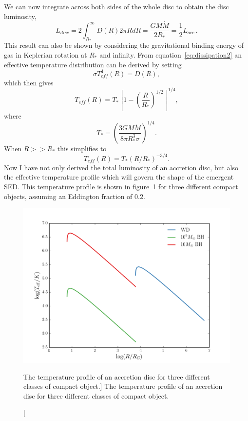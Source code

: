We can now integrate across both sides of the whole disc to obtain the disc luminosity,
\begin{equation}
L_{disc} = 2 \int^\infty_{R_*} D(R) 2\pi R dR = \frac{G M \dot{M}}{2 R_*} = \frac{1}{2} L_{acc}\, .
\label{eq:ldisc}
\end{equation}
This result can also be shown by considering the gravitational
binding energy of gas in Keplerian rotation at $R_*$ and infinity.
From equation~\ref{eq:dissipation2} an 
effective temperature distribution can be derived by setting
\begin{equation}
\sigma T_{eff}^4 (R) = D(R),
\end{equation}
which then gives
\begin{equation}
T_{eff} (R) = T_* \left[1 - \left( \frac{R}{R_*} \right)^{1/2} \right]^{1/4},
\label{disk_t_profile}
\end{equation}
where
\begin{equation}
T_* = \left ( \frac{3 G M \dot{M}}{8 \pi R_*^3 \sigma} \right)^{1/4}.
\end{equation}
When $R>>R_*$ this simplifies to
\begin{equation}
T_{eff} (R) = T_* (R / R_*)^{-3/4}.
\end{equation}
Now I have not only derived the total luminosity of an accretion disc, but
also the effective temperature profile which will govern the shape of the emergent SED.
This temperature profile is shown in figure~\ref{fig:disk_t}
for three different compact objects, assuming an Eddington fraction of 0.2.

\begin{figure}
\centering
\includegraphics[width=1.0\textwidth]{figures/01-intro/disk_t.png}
\caption
[The temperature profile of an accretion disc for three different classes
of compact object.]
{
The temperature profile of an accretion disc for three different classes
of compact object.
} 
\label{fig:disk_t}
\end{figure}

